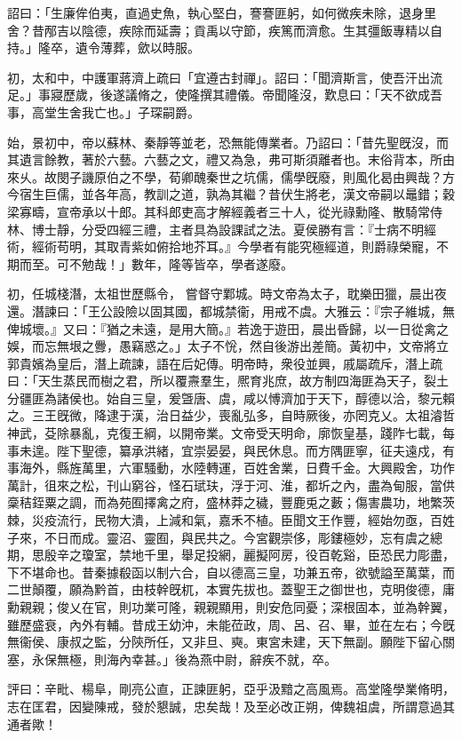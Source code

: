 \begin{pinyinscope}
 
詔曰：「生廉侔伯夷，直過史魚，執心堅白，謇謇匪躬，如何微疾未除，退身里舍？昔邴吉以陰德，疾除而延壽；貢禹以守節，疾篤而濟愈。生其彊飯專精以自持。」隆卒，遺令薄葬，歛以時服。
 
 
 
 
 初，太和中，中護軍蔣濟上疏曰「宜遵古封禪」。詔曰：「聞濟斯言，使吾汗出流足。」事寢歷歲，後遂議脩之，使隆撰其禮儀。帝聞隆沒，歎息曰：「天不欲成吾事，高堂生舍我亡也。」子琛嗣爵。
 
 
 
 
 始，景初中，帝以蘇林、秦靜等並老，恐無能傳業者。乃詔曰：「昔先聖旣沒，而其遺言餘教，著於六藝。六藝之文，禮又為急，弗可斯須離者也。末俗背本，所由來乆。故閔子譏原伯之不學，荀卿醜秦世之坑儒，儒學旣廢，則風化曷由興哉？方今宿生巨儒，並各年高，教訓之道，孰為其繼？昔伏生將老，漢文帝嗣以鼂錯；穀梁寡疇，宣帝承以十郎。其科郎吏高才解經義者三十人，從光祿勳隆、散騎常侍林、博士靜，分受四經三禮，主者具為設課試之法。夏侯勝有言：『士病不明經術，經術苟明，其取青紫如俯拾地芥耳。』今學者有能究極經道，則爵祿榮寵，不期而至。可不勉哉！」數年，隆等皆卒，學者遂廢。
 
 
初，任城棧潛，太祖世歷縣令，
 嘗督守鄴城。時文帝為太子，耽樂田獵，晨出夜還。潛諫曰：「王公設險以固其國，都城禁衞，用戒不虞。大雅云：『宗子維城，無俾城壞。』又曰：『猶之未遠，是用大簡。』若逸于遊田，晨出昏歸，以一日從禽之娛，而忘無垠之釁，愚竊惑之。」太子不恱，然自後游出差簡。黃初中，文帝將立郭貴嬪為皇后，潛上疏諫，語在后妃傳。明帝時，衆役並興，戚屬疏斥，潛上疏曰：「天生蒸民而樹之君，所以覆燾羣生，熈育兆庶，故方制四海匪為天子，裂土分疆匪為諸侯也。始自三皇，爰曁唐、虞，咸以愽濟加于天下，醇德以洽，黎元賴之。三王旣微，降逮于漢，治日益少，喪亂弘多，自時厥後，亦罔克乂。太祖濬哲神武，芟除暴亂，克復王綱，以開帝業。文帝受天明命，廓恢皇基，踐阼七載，每事未遑。陛下聖德，纂承洪緒，宜崇晏晏，與民休息。而方隅匪寧，征夫遠戍，有事海外，縣旌萬里，六軍騷動，水陸轉運，百姓舍業，日費千金。大興殿舍，功作萬計，徂來之松，刊山窮谷，怪石珷玞，浮于河、淮，都圻之內，盡為甸服，當供稾秸銍粟之調，而為苑囿擇禽之府，盛林莽之穢，豐鹿兎之藪；傷害農功，地繁茨棘，災疫流行，民物大潰，上減和氣，嘉禾不植。臣聞文王作豐，經始勿亟，百姓子來，不日而成。靈沼、靈囿，與民共之。今宮觀崇侈，彫鏤極妙，忘有虞之總期，思殷辛之瓊室，禁地千里，舉足投網，麗擬阿房，役百乾谿，臣恐民力彫盡，下不堪命也。昔秦據殽函以制六合，自以德高三皇，功兼五帝，欲號謚至萬葉，而二世顛覆，願為黔首，由枝幹旣杌，本實先拔也。蓋聖王之御世也，克明俊德，庸勳親親；俊乂在官，則功業可隆，親親顯用，則安危同憂；深根固本，並為幹翼，雖歷盛衰，內外有輔。昔成王幼沖，未能莅政，周、呂、召、畢，並在左右；今旣無衞侯、康叔之監，分陝所任，又非旦、奭。東宮未建，天下無副。願陛下留心關塞，永保無極，則海內幸甚。」後為燕中尉，辭疾不就，卒。
 
 
 
 
 評曰：辛毗、楊阜，剛亮公直，正諫匪躬，亞乎汲黯之高風焉。高堂隆學業脩明，志在匡君，因變陳戒，發於懇誠，忠矣哉！及至必改正朔，俾魏祖虞，所謂意過其通者歟！
 
 
\end{pinyinscope}